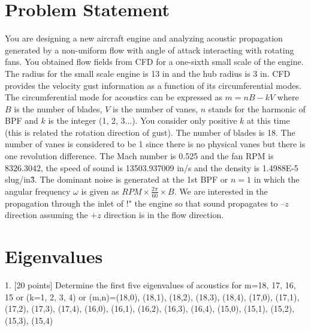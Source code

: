 \documentclass[]{aiaa-tc}%
\begin{document}



\section*{Problem Statement}

You are designing a new aircraft engine and analyzing acoustic propagation generated by a non-uniform flow with angle of attack interacting with rotating fans. You obtained flow fields from CFD for a one-sixth small scale of the engine. The radius for the small scale engine is 13 in and the hub radius is 3 in. CFD provides the velocity gust information as a function of its circumferential modes. The circumferential mode for acoustics can be expressed as $m = nB − kV$ where $B$ is the number of blades, $V$ is the number of vanes, $n$ stands for the harmonic of BPF and $k$ is the integer (1, 2, 3...). You consider only positive $k$ at this time (this is related the rotation direction of gust). The number of blades is 18. The number of vanes is considered to be 1 since there is no physical vanes but there is one revolution difference. The Mach number is 0.525 and the fan RPM is 8326.3042, the speed of sound is 13503.937009 in/s and the density is 1.4988E-5 slug/in\^3. The dominant noise is generated at the 1st BPF or $n=1$ in which the
angular frequency $\omega$ is given as $RPM \times \frac{2\pi}{60}\times B$. We are interested in the propagation through the inlet of !"
the engine so that sound propagates to $–z$ direction assuming the $+z$ direction is in the flow direction.



\section{Eigenvalues}

1. [20 points] Determine the first five eigenvalues of acoustics for m=18, 17, 16, 15 or (k=1, 2, 3, 4) or (m,n)=(18,0), (18,1), (18,2), (18,3), (18,4), (17,0), (17,1), (17,2), (17,3), (17,4), (16,0), (16,1), (16,2), (16,3), (16,4), (15,0), (15,1), (15,2), (15,3), (15,4)
\end{document}
